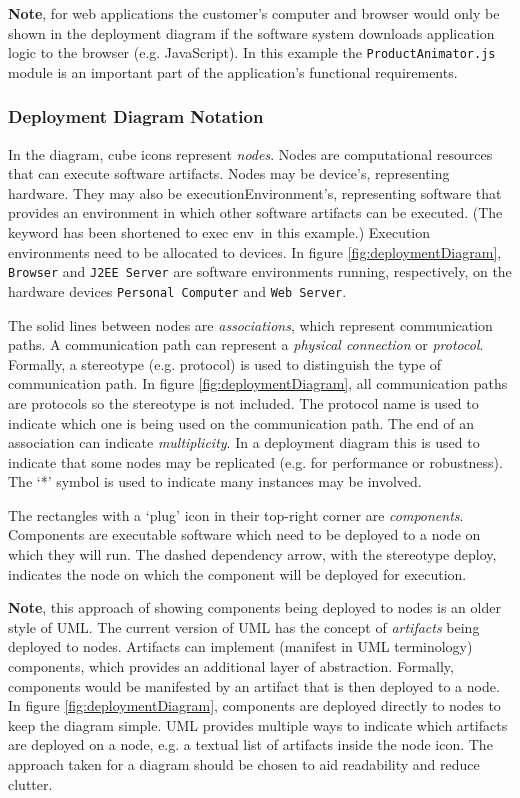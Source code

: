 \textbf{Note}, for web applications the customer's computer and browser would only be shown in the deployment diagram
if the software system downloads application logic to the browser (e.g. JavaScript).
In this example the \texttt{ProductAnimator.js} module is an important part of the application's functional requirements.

\subsubsection{Deployment Diagram Notation}\label{sec:deploymentNotation}
In the diagram, cube icons represent \emph{nodes}. Nodes are computational resources that can execute software artifacts.
Nodes may be \guillemotleft device\guillemotright's, representing hardware.
They may also be \guillemotleft executionEnvironment\guillemotright's, representing software that provides an environment in which other software artifacts can be executed.
(The keyword has been shortened to \guillemotleft exec env\guillemotright~in this example.)
Execution environments need to be allocated to devices.
In figure \ref{fig:deploymentDiagram}, \texttt{Browser} and \texttt{J2EE Server} are software environments running,
respectively, on the hardware devices \texttt{Personal Computer} and \texttt{Web Server}.

The solid lines between nodes are \emph{associations}, which represent communication paths.
A communication path can represent a \emph{physical connection} or \emph{protocol}.
Formally, a stereotype (e.g. \guillemotleft protocol\guillemotright) is used to distinguish the type of communication path.
In figure \ref{fig:deploymentDiagram}, all communication paths are protocols so the stereotype is not included.
The protocol name is used to indicate which one is being used on the communication path.
The end of an association can indicate \emph{multiplicity}.
In a deployment diagram this is used to indicate that some nodes may be replicated
(e.g. for performance or robustness). The `*' symbol is used to indicate many instances may be involved.

The rectangles with a `plug' icon in their top-right corner are \emph{components}.
Components are executable software which need to be deployed to a node on which they will run.
The dashed dependency arrow, with the stereotype \guillemotleft deploy\guillemotright, indicates the node on which the component will be deployed for execution.

\textbf{Note}, this approach of showing components being deployed to nodes is an older style of UML.
The current version of UML has the concept of \emph{artifacts} being deployed to nodes.
Artifacts can implement (manifest in UML terminology) components, which provides an additional layer of abstraction.
Formally, components would be manifested by an artifact that is then deployed to a node.
In figure \ref{fig:deploymentDiagram}, components are deployed directly to nodes to keep the diagram simple.
UML provides multiple ways to indicate which artifacts are deployed on a node, e.g. a textual list of artifacts inside the node icon.
The approach taken for a diagram should be chosen to aid readability and reduce clutter.

